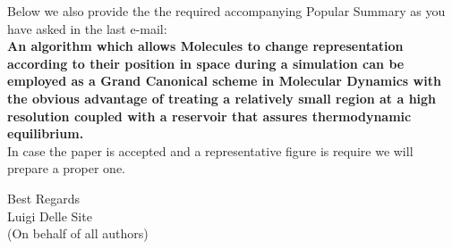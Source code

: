 \documentclass[12pt,a4paper]{article}
\begin{document}
Below we also provide the  the required accompanying Popular Summary as you have asked in the last e-mail:\\

{\bf An algorithm which allows Molecules to change representation according to their position in space during a simulation can be employed as a Grand Canonical scheme in Molecular Dynamics with the obvious advantage of treating a relatively small region at a high resolution coupled with a reservoir that assures thermodynamic equilibrium.
}\\

In case the paper is accepted and a representative figure is require we will prepare a proper one.



Best Regards\\



Luigi Delle Site\\
(On behalf of all authors)\\
\end{document}
